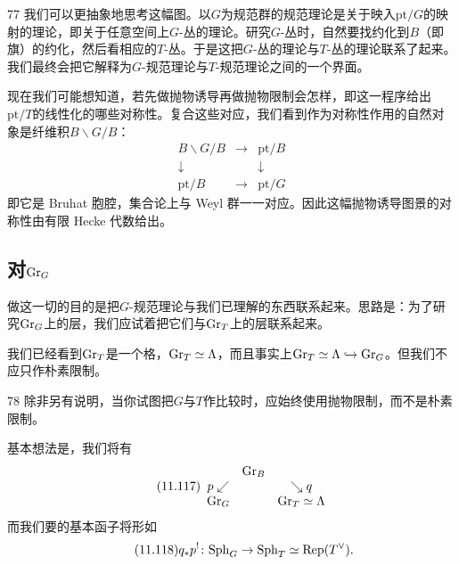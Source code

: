 \begin{srcrem}{77}
我们可以更抽象地思考这幅图。以$G$为规范群的规范理论是关于映入$\mathrm{pt}/G$的映射的理论，即关于任意空间上$G$-丛的理论。研究$G$-丛时，自然要找约化到$B$（即旗）的约化，然后看相应的$T$-丛。于是这把$G$-丛的理论与$T$-丛的理论联系了起来。我们最终会把它解释为$G$-规范理论与$T$-规范理论之间的一个界面。
\end{srcrem}

现在我们可能想知道，若先做抛物诱导再做抛物限制会怎样，即这一程序给出$\mathrm{pt}/T$的线性化的哪些对称性。复合这些对应，我们看到作为对称性作用的自然对象是纤维积$B\backslash G/B$：
\begin{equation}\tag{11.116}
\begin{array}{ccc}
B\backslash G/B & \longrightarrow & \mathrm{pt}/B\\
\downarrow & & \downarrow\\
\mathrm{pt}/B & \longrightarrow & \mathrm{pt}/G
\end{array}
\end{equation}
即它是 Bruhat 胞腔，集合论上与 Weyl 群一一对应。因此这幅抛物诱导图景的对称性由有限 Hecke 代数给出。

\subsection{对$\mathrm{Gr}_G$}\label{sec:11-6-2}

做这一切的目的是把$G$-规范理论与我们已理解的东西联系起来。思路是：为了研究$\mathrm{Gr}_G$上的层，我们应试着把它们与$\mathrm{Gr}_T$上的层联系起来。

我们已经看到$\mathrm{Gr}_T$是一个格，$\mathrm{Gr}_T\simeq\Lambda$，而且事实上$\mathrm{Gr}_T\simeq\Lambda\hookrightarrow\mathrm{Gr}_G$。但我们不应只作朴素限制。

\begin{srcrem}{78}
除非另有说明，当你试图把$G$与$T$作比较时，应始终使用抛物限制，而不是朴素限制。
\end{srcrem}

基本想法是，我们将有
\begin{equation}\tag{11.117}
\begin{array}{ccc}
 & \mathrm{Gr}_B & \\
 p\swarrow & & \searrow q\\
 \mathrm{Gr}_G & & \mathrm{Gr}_T\simeq\Lambda
\end{array}
\end{equation}
而我们要的基本函子将形如
\begin{equation}\tag{11.118}
q_{*}p^{!}\colon\mathrm{Sph}_G\to\mathrm{Sph}_T\simeq\mathrm{Rep}(T^{\vee}).
\end{equation}

